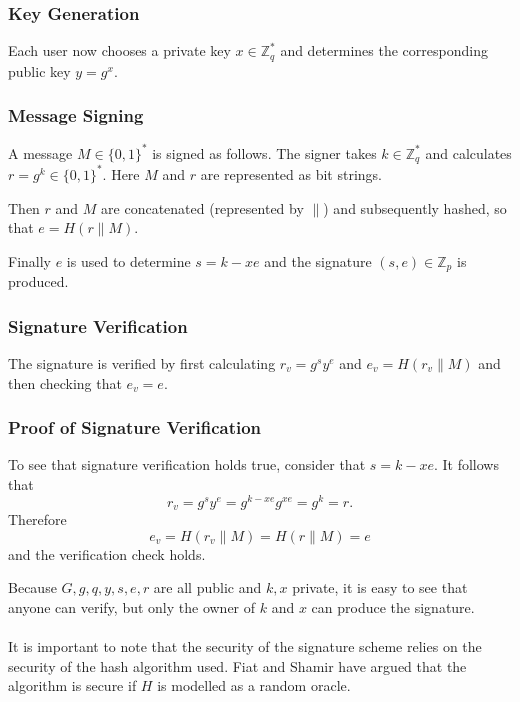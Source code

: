 \subsubsection{Key Generation}
Each user now chooses a private key $x\in \mathbb{Z}_{q}^*$ and determines the corresponding public key $y=g^x$.

\subsubsection{Message Signing}
A message $M\in\{0,1\}^*$ is signed as follows. The signer takes $k\in\mathbb{Z}_q^*$ and calculates $r=g^k\in\{0,1\}^*$. Here $M$ and $r$ are represented as bit strings.

Then $r$ and $M$ are concatenated (represented by $\parallel$) and subsequently hashed, so that $e=H(r\parallel M)$.

Finally $e$ is used to determine $s=k-xe$ and the signature $(s,e)\in\mathbb{Z}_p$ is produced.

\subsubsection{Signature Verification}
The signature is verified by first calculating $r_v=g^sy^e$ and $e_v=H(r_v\parallel M)$ and then checking that $e_v=e$.

\subsubsection{Proof of Signature Verification}
To see that signature verification holds true, consider that $s=k-xe$. It follows that
\begin{equation*}
r_v=g^sy^e=g^{k-xe}g^{xe}=g^k=r .
\end{equation*}
Therefore
\begin{equation*}
e_v=H(r_v\parallel M)=H(r\parallel M)=e
\end{equation*}
and the verification check holds.

Because $G,g,q,y,s,e,r$ are all public and $k,x$ private, it is easy to see that anyone can verify, but only the owner of $k$ and $x$ can produce the signature.
\\
\\
It is important to note that the security of the signature scheme relies on the security of the hash algorithm used. Fiat and Shamir have argued \cite{Oracle} that the algorithm is secure if $H$ is modelled as a random oracle.

